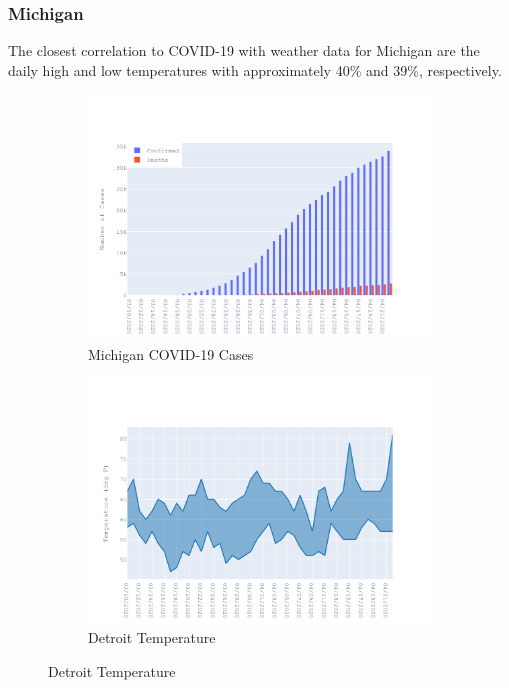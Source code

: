 \documentclass{homework}
\begin{document}
\newpage
\subsubsection{Michigan}

The closest correlation to COVID-19 with weather data for Michigan are the daily high and low temperatures with approximately 40\% and 39\%, respectively.

\begin{figure}[H]
  \centering
  \begin{subfigure}{0.45\linewidth}
    \includegraphics[width=\linewidth]{task4/Michigan_cases.png}
    \caption{Michigan COVID-19 Cases}
  \end{subfigure}
  \hfil
  \begin{subfigure}{0.45\linewidth}
    \includegraphics[width=\linewidth]{task4/Michigan_temp.png}
    \caption{Detroit Temperature}
  \end{subfigure}


\end{figure}
\end{document}
